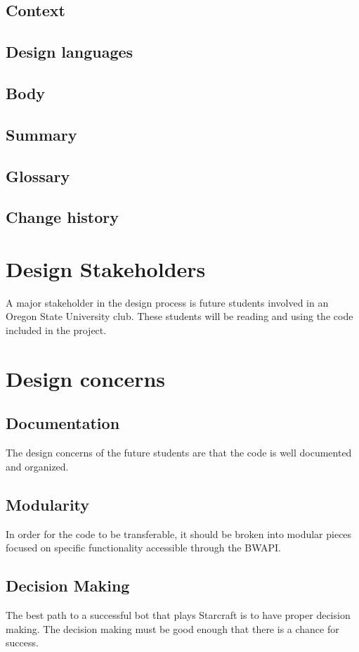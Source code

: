 \documentclass[10pt,letterpaper,onecolumn,draftclsnofoot]{IEEEtran}
\begin{document}
\subsection{Context}

\subsection{Design languages}

\subsection{Body}

\subsection{Summary}

\subsection{Glossary}

\subsection{Change history}


\section{Design Stakeholders}
	A major stakeholder in the design process is future students involved in an Oregon State University club. These students will be reading and using the code included in the project.
	
\section{Design concerns}
\subsection{Documentation}
	The design concerns of the future students are that the code is well documented and organized. 
\subsection{Modularity}
	In order for the code to be transferable, it should be broken into modular pieces focused on specific functionality accessible through the BWAPI.
\subsection{Decision Making}
	The best path to a successful bot that plays Starcraft is to have proper decision making. The decision making must be good enough that there is a chance for success.
	
\end{document}
